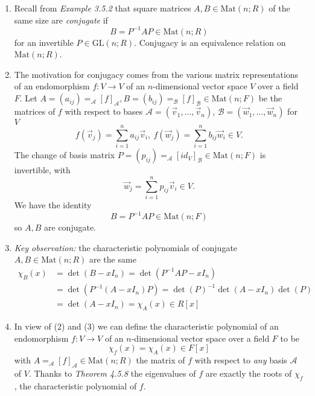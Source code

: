 \documentclass[11pt,a4paper]{article}
\begin{document}
\begin{itemize}
\begin{enumerate}
            \item Recall from \emph{Example 3.5.2} that square matrices
                $A, B \in \mathrm{Mat}(n; R)$ of the same size are \emph{conjugate} if
                \[
                    B = P^{-1} AP \in \mathrm{Mat}(n; R)
                \]
                for an invertible $P \in \mathrm{GL}(n; R)$.
                Conjugacy is an equivalence relation on $\mathrm{Mat}(n; R)$.

            \item The motivation for conjugacy comes from the various matrix representations of
                an endomorphism $f : V \to V$ of an $n$-dimensional vector space $V$ over a
                field $F$.
                Let $A = (a_{ij}) = _\mathcal{A} {[f]}_\mathcal{A},
                B = (b_{ij}) = _\mathcal{B} {[f]}_\mathcal{B} \in \mathrm{Mat}(n; F)$
                be the matrices of $f$ with respect to bases
                $\mathcal{A} = (\vec{v}_1, \ldots, \vec{v}_n)$,
                $\mathcal{B} = (\vec{w}_1, \ldots, \vec{w}_n)$ for $V$
                \[
                    f(\vec{v}_j) = \sum_{i=1}^n a_{ij} \vec{v}_i, \ f(\vec{w}_j) =
                    \sum_{i=1}^n b_{ij} \vec{w}_i \in V.
                \]
                The change of basis matrix $P = (p_{ij}) =
                _\mathcal{A} {[id_V]}_\mathcal{B} \in \mathrm{Mat}(n; F)$
                is invertible, with
                \[
                    \vec{w}_j = \sum_{i=1}^n p_{ij} \vec{v}_i \in V.
                \]
                We have the identity
                \[
                    B = P^{-1} AP \in \mathrm{Mat} (n; F)
                \]
                so $A, B$ are conjugate.

            \item \emph{Key observation:} the characteristic polynomials of conjugate
                $A, B \in \mathrm{Mat} (n; R)$ are the same
                \begin{align*}{}
                    \chi_B (x) &= \det(B-xI_n) = \det(P^{-1} AP - xI_n) \\
                               &= \det(P^{-1} (A - xI_n)P) =
                               \det{(P)}^{-1} \det(A-xI_n) \det(P) \\
                               &= \det(A-xI_n) = \chi_A(x) \in R[x]
                \end{align*}

            \item In view of (2) and (3) we can define the characteristic polynomial of an
                endomorphism $f : V \to V$ of an $n$-dimensional vector space over a field
                $F$ to be
                \[
                    \chi_f(x) = \chi_A(x) \in F[x]
                \]
                with $A = _\mathcal{A} {[f]}_\mathcal{A} \in \mathrm{Mat}(n; R)$ the matrix of
                $f$ with respect to \emph{any} basis $\mathcal{A}$ of $V$.
                Thanks to \emph{Theorem 4.5.8} the eigenvalues of $f$ are exactly the roots of
                $\chi_f$, the characteristic polynomial of $f$.


\end{enumerate}
\end{itemize}
\end{document}
